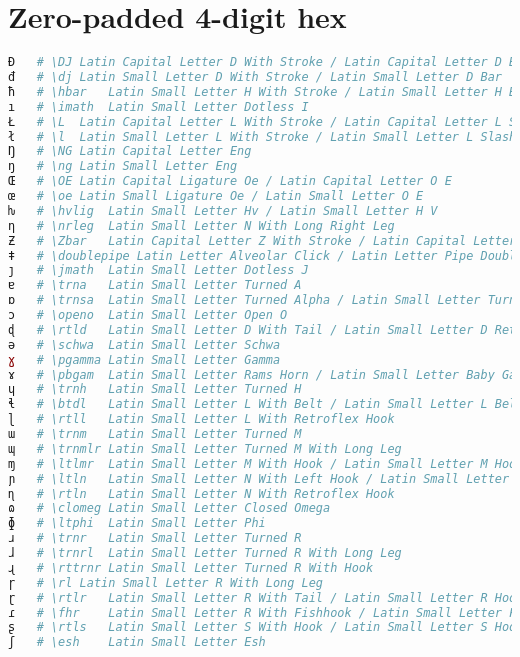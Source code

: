 \section{Zero-padded 4-digit hex}
\begin{lstlisting}[language=Julia, linewidth=\textwidth]
Đ   # \DJ Latin Capital Letter D With Stroke / Latin Capital Letter D Bar
đ   # \dj Latin Small Letter D With Stroke / Latin Small Letter D Bar
ħ   # \hbar   Latin Small Letter H With Stroke / Latin Small Letter H Bar
ı   # \imath  Latin Small Letter Dotless I
Ł   # \L  Latin Capital Letter L With Stroke / Latin Capital Letter L Slash
ł   # \l  Latin Small Letter L With Stroke / Latin Small Letter L Slash
Ŋ   # \NG Latin Capital Letter Eng
ŋ   # \ng Latin Small Letter Eng
Œ   # \OE Latin Capital Ligature Oe / Latin Capital Letter O E
œ   # \oe Latin Small Ligature Oe / Latin Small Letter O E
ƕ   # \hvlig  Latin Small Letter Hv / Latin Small Letter H V
ƞ   # \nrleg  Latin Small Letter N With Long Right Leg
Ƶ   # \Zbar   Latin Capital Letter Z With Stroke / Latin Capital Letter Z Bar
ǂ   # \doublepipe Latin Letter Alveolar Click / Latin Letter Pipe Double Bar
ȷ   # \jmath  Latin Small Letter Dotless J
ɐ   # \trna   Latin Small Letter Turned A
ɒ   # \trnsa  Latin Small Letter Turned Alpha / Latin Small Letter Turned Script A
ɔ   # \openo  Latin Small Letter Open O
ɖ   # \rtld   Latin Small Letter D With Tail / Latin Small Letter D Retroflex Hook
ə   # \schwa  Latin Small Letter Schwa
ɣ   # \pgamma Latin Small Letter Gamma
ɤ   # \pbgam  Latin Small Letter Rams Horn / Latin Small Letter Baby Gamma
ɥ   # \trnh   Latin Small Letter Turned H
ɬ   # \btdl   Latin Small Letter L With Belt / Latin Small Letter L Belt
ɭ   # \rtll   Latin Small Letter L With Retroflex Hook
ɯ   # \trnm   Latin Small Letter Turned M
ɰ   # \trnmlr Latin Small Letter Turned M With Long Leg
ɱ   # \ltlmr  Latin Small Letter M With Hook / Latin Small Letter M Hook
ɲ   # \ltln   Latin Small Letter N With Left Hook / Latin Small Letter N Hook
ɳ   # \rtln   Latin Small Letter N With Retroflex Hook
ɷ   # \clomeg Latin Small Letter Closed Omega
ɸ   # \ltphi  Latin Small Letter Phi
ɹ   # \trnr   Latin Small Letter Turned R
ɺ   # \trnrl  Latin Small Letter Turned R With Long Leg
ɻ   # \rttrnr Latin Small Letter Turned R With Hook
ɼ   # \rl Latin Small Letter R With Long Leg
ɽ   # \rtlr   Latin Small Letter R With Tail / Latin Small Letter R Hook
ɾ   # \fhr    Latin Small Letter R With Fishhook / Latin Small Letter Fishhook R
ʂ   # \rtls   Latin Small Letter S With Hook / Latin Small Letter S Hook
ʃ   # \esh    Latin Small Letter Esh

\end{lstlisting}
